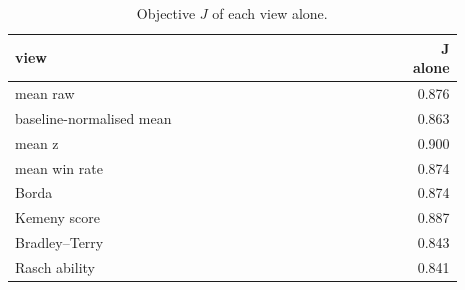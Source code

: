 \begin{table}[htbp]
\centering\scriptsize
\caption{Objective $J$ of each view alone.}
\label{tab:single_views}
\setlength{\tabcolsep}{3pt}
\begin{tabular}{p{0.892\linewidth}r}
\toprule
view & J alone \\
\midrule
mean raw & 0.876 \\
baseline-normalised mean & 0.863 \\
mean z & 0.900 \\
mean win rate & 0.874 \\
Borda & 0.874 \\
Kemeny score & 0.887 \\
Bradley--Terry & 0.843 \\
Rasch ability & 0.841 \\
\bottomrule
\end{tabular}
\end{table}
